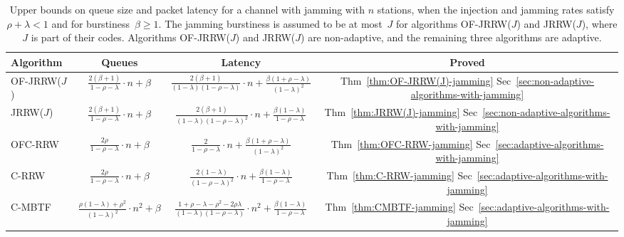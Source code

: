 \documentclass[11pt]{article}
\newcommand{\FF}{\vspace*{\medskipamount}}
\newcommand{\RB}{\raisebox{3ex}{~}}
\newcommand{\LB}{\raisebox{-1.5ex}{~}}
\newlength{\pagewidth}
\begin{document}
\begin{table}[t]
\begin{center}
\begin{tabular}{|l |c |c |c|}
\hline
\RB \LB
Algorithm & Queues & Latency & Proved\\
\hline
\hline
\RB \LB
\textsc{OF-JRRW($J$)}& $\frac{2(\beta+1)}{1-\rho-\lambda} \cdot n+\beta$& $\frac{2(\beta+1)}{(1-\lambda)(1-\rho-\lambda)}\cdot n + \frac{\beta(1+\rho-\lambda)}{(1-\lambda)^2}$& Thm~\ref{thm:OF-JRRW(J)-jamming} Sec~\ref{sec:non-adaptive-algorithms-with-jamming}\\
\hline
\RB \LB
\textsc{JRRW}($J$) & $\frac{2(\beta+1)}{1-\rho-\lambda}\cdot n +\beta$& $\frac{2(\beta+1)}{(1-\lambda)(1-\rho-\lambda)^2}\cdot n + \frac{\beta(1-\lambda)}{1-\rho-\lambda}$ &Thm~\ref{thm:JRRW(J)-jamming} Sec~\ref{sec:non-adaptive-algorithms-with-jamming}\\
\hline
\RB \LB
\textsc{OFC-RRW} & $\frac{2\rho}{1-\rho-\lambda}\cdot n +\beta$ &$\frac{2}{1-\rho-\lambda} \cdot n+ \frac{\beta(1+\rho-\lambda) }{(1-\lambda)^2}$&Thm~\ref{thm:OFC-RRW-jamming} Sec~\ref{sec:adaptive-algorithms-with-jamming}\\
\hline
\RB \LB
 \textsc{C-RRW} &$\frac{2\rho}{1-\rho-\lambda}\cdot n +\beta$ &$\frac{2(1-\lambda)}{(1-\rho-\lambda)^2}\cdot n + \frac{\beta(1-\lambda)}{1-\rho-\lambda}$ &Thm~\ref{thm:C-RRW-jamming} Sec~\ref{sec:adaptive-algorithms-with-jamming}\\
\hline
\RB \LB
 \textsc{C-MBTF} &$\frac{\rho(1-\lambda)+\rho^2 }{(1-\lambda)^2}\cdot n^2 + \beta$ &$\frac{1+\rho-\lambda -\rho^2-2\rho\lambda}{(1-\lambda)(1-\rho-\lambda)}  \cdot n^2 + \frac{\beta(1-\lambda)}{1-\rho-\lambda}$ & Thm~\ref{thm:CMBTF-jamming} Sec~\ref{sec:adaptive-algorithms-with-jamming}\\
\hline
\end{tabular}
\parbox{\pagewidth}{\FF\caption{\label{tab:jamming} 
Upper bounds on queue size and packet latency for a channel with jamming  with $n$ stations,  when the injection and jamming rates satisfy $\rho+\lambda<1$ and for burstiness~$\beta\ge 1$.
The jamming burstiness is assumed to be at most~$J$ for algorithms \textsc{OF-JRRW($J$)} and \textsc{JRRW($J$)}, where $J$ is part of their codes.
Algorithms \textsc{OF-JRRW($J$)} and \textsc{JRRW($J$)} are non-adaptive, and the remaining three algorithms are adaptive.
}}
\end{center}
\end{table}



\end{document}
